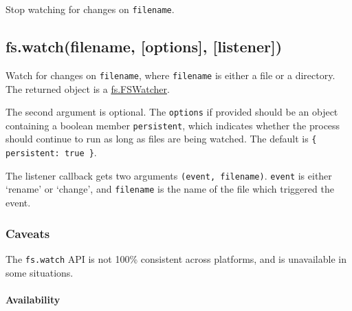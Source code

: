 \begin{Shaded}
\begin{Highlighting}[]
\NormalTok{: } \NormalTok{- }  
\end{Highlighting}
\end{Shaded}

Stop watching for changes on \texttt{filename}.

\subsection{fs.watch(filename, {[}options{]}, {[}listener{]})}

\begin{Shaded}
\begin{Highlighting}[]
\NormalTok{: } \NormalTok{- }
\end{Highlighting}
\end{Shaded}

Watch for changes on \texttt{filename}, where \texttt{filename} is
either a file or a directory. The returned object is a
\hyperref[fs_class_fs_fswatcher]{fs.FSWatcher}.

The second argument is optional. The \texttt{options} if provided should
be an object containing a boolean member \texttt{persistent}, which
indicates whether the process should continue to run as long as files
are being watched. The default is \texttt{\{ persistent: true \}}.

The listener callback gets two arguments \texttt{(event, filename)}.
\texttt{event} is either `rename' or `change', and \texttt{filename} is
the name of the file which triggered the event.

\subsubsection{Caveats}

The \texttt{fs.watch} API is not 100\% consistent across platforms, and
is unavailable in some situations.

\paragraph{Availability}

